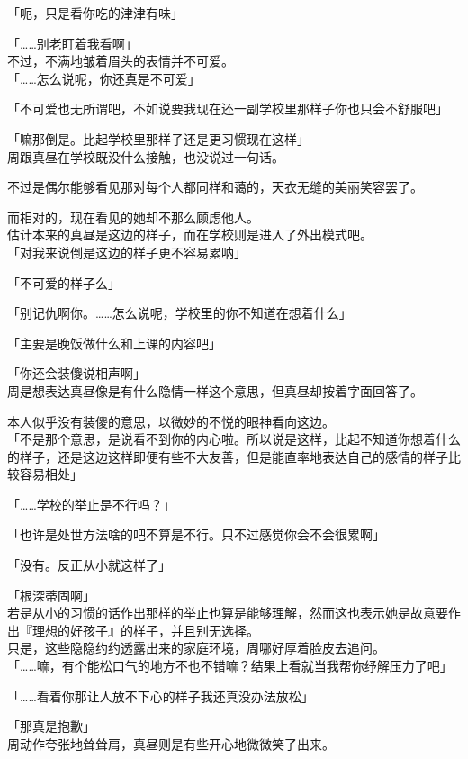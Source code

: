 「呃，只是看你吃的津津有味」

「……别老盯着我看啊」\\

不过，不满地皱着眉头的表情并不可爱。\\

「……怎么说呢，你还真是不可爱」

「不可爱也无所谓吧，不如说要我现在还一副学校里那样子你也只会不舒服吧」

「嘛那倒是。比起学校里那样子还是更习惯现在这样」\\

周跟真昼在学校既没什么接触，也没说过一句话。

不过是偶尔能够看见那对每个人都同样和蔼的，天衣无缝的美丽笑容罢了。

而相对的，现在看见的她却不那么顾虑他人。\\

估计本来的真昼是这边的样子，而在学校则是进入了外出模式吧。\\

「对我来说倒是这边的样子更不容易累呐」

「不可爱的样子么」

「别记仇啊你。……怎么说呢，学校里的你不知道在想着什么」

「主要是晚饭做什么和上课的内容吧」

「你还会装傻说相声啊」\\

周是想表达真昼像是有什么隐情一样这个意思，但真昼却按着字面回答了。

本人似乎没有装傻的意思，以微妙的不悦的眼神看向这边。\\

「不是那个意思，是说看不到你的内心啦。所以说是这样，比起不知道你想着什么的样子，还是这边这样即便有些不大友善，但是能直率地表达自己的感情的样子比较容易相处」

「……学校的举止是不行吗？」

「也许是处世方法啥的吧不算是不行。只不过感觉你会不会很累啊」

「没有。反正从小就这样了」

「根深蒂固啊」\\

若是从小的习惯的话作出那样的举止也算是能够理解，然而这也表示她是故意要作出『理想的好孩子』的样子，并且别无选择。\\

只是，这些隐隐约约透露出来的家庭环境，周哪好厚着脸皮去追问。\\

「……嘛，有个能松口气的地方不也不错嘛？结果上看就当我帮你纾解压力了吧」

「……看着你那让人放不下心的样子我还真没办法放松」

「那真是抱歉」\\

周动作夸张地耸耸肩，真昼则是有些开心地微微笑了出来。
